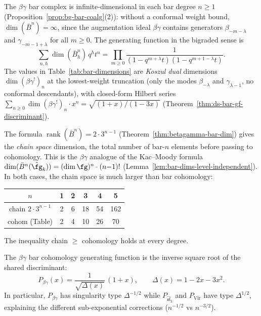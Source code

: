 \begin{remark}\label{rem:betagamma-conventions}
The $\beta\gamma$ bar complex is infinite-dimensional in each bar
degree $n \geq 1$ (Proposition~\ref{prop:bg-bar-coalg}(2)):
without a conformal weight bound,
$\dim(\bar{B}^n) = \infty$, since the augmentation ideal
$\overline{\beta\gamma}$ contains generators $\beta_{-m-\lambda}$
and $\gamma_{-m-1+\lambda}$ for all $m \geq 0$.
The generating function in the bigraded sense is
\[
\sum_{n,h} \dim(\bar{B}^n_h)\, q^h t^n
= \prod_{m \geq 0}
 \frac{1}{(1-q^{m+\lambda}t)(1-q^{m+1-\lambda}t)}.
\]
The values in Table~\ref{tab:bar-dimensions}
are \emph{Koszul dual} dimensions $\dim (\beta\gamma^!)_n$
at the lowest-weight truncation (only the modes
$\beta_{-\lambda}$ and $\gamma_{\lambda-1}$, no conformal descendants),
with closed-form Hilbert series
$\sum_{n \geq 0} \dim (\beta\gamma^!)_n \cdot x^n = \sqrt{(1{+}x)/(1{-}3x)}$
(Theorem~\ref{thm:ds-bar-gf-discriminant}).

The formula $\operatorname{rank}(\bar{B}^n) = 2 \cdot 3^{n-1}$
(Theorem~\ref{thm:betagamma-bar-dim}) gives the \emph{chain space}
dimension, the total number of bar-$n$ elements before passing to
cohomology. This is the $\beta\gamma$ analogue of the Kac--Moody
formula $\dim(\bar{B}^n(\hat{\fg}_k)) = (\dim\fg)^n \cdot (n{-}1)!$
(Lemma~\ref{lem:bar-dims-level-independent}). In both cases,
the chain space is much larger than bar cohomology:
\begin{center}
\begin{tabular}{c|ccccc}
$n$ & 1 & 2 & 3 & 4 & 5 \\
\hline
chain $2 \cdot 3^{n-1}$ & 2 & 6 & 18 & 54 & 162 \\
cohom (Table) & 2 & 4 & 10 & 26 & 70
\end{tabular}
\end{center}
The inequality chain $\geq$ cohomology holds at every degree.
\end{remark}

\begin{corollary}
\label{cor:betagamma-inverse-discriminant}
The $\beta\gamma$ bar cohomology generating function is the inverse square root of the shared discriminant:
\[
P_{\beta\gamma}(x) = \frac{1}{\sqrt{\Delta(x)}}\,(1+x),
\qquad \Delta(x) = 1-2x-3x^2.
\]
In particular, $P_{\beta\gamma}$ has singularity type $\Delta^{-1/2}$ while $P_{\widehat{\mathfrak{sl}}_2}$ and $P_{\mathrm{Vir}}$ have type $\Delta^{1/2}$, explaining the different sub-exponential corrections ($n^{-1/2}$ vs $n^{-3/2}$).
\end{corollary}

